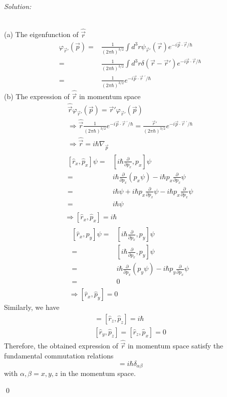 \documentclass[12pt,a4paper]{article}
\newenvironment{sol}
    {\emph{Solution:}
    }
    {
    \qed
    }
\begin{document}
\begin{sol}
\\(a) The eigenfunction of $\hat{\vec{r}}$
\begin{align}
\nonumber\varphi_{\vec{r}'}(\vec{p})=&\frac{1}{(2\pi\hbar)^{3/2}}\int d^3r\psi_{\vec{r}'}(\vec{r})e^{-i\vec{p}\cdot\vec{r}/\hbar}\\
\nonumber=&\frac{1}{(2\pi\hbar)^{3/2}}\int d^3r\delta(\vec{r}-\vec{r}')e^{-i\vec{p}\cdot\vec{r}/\hbar}\\
=&\frac{1}{(2\pi\hbar)^{3/2}}e^{-i\vec{p}\cdot\vec{r}{~}^{'}/\hbar}
\end{align}
(b) The expression of $\hat{\vec{r}}$ in momentum space
\begin{gather}
\hat{\vec{r}}\varphi_{\vec{r}'}(\vec{p})=\vec{r}'\varphi_{\vec{r}'}(\vec{p})\\
\Longrightarrow\hat{\vec{r}}\frac{1}{(2\pi\hbar)^{3/2}}e^{-i\vec{p}\cdot\vec{r}{~}^{'}/\hbar}=\frac{\vec{r}'}{(2\pi\hbar)^{3/2}}e^{-i\vec{p}\cdot\vec{r}{~}^{'}/\hbar}\\
\Longrightarrow\hat{\vec{r}}=i\hbar\nabla_{\vec{p}}
\end{gather}
\begin{gather}
\begin{align}
\nonumber[\hat{r}_x,\hat{p}_x]\psi=&[i\hbar\frac{\partial}{\partial p_x},p_x]\psi\\
\nonumber=&i\hbar\frac{\partial}{\partial p_x}(p_x\psi)-i\hbar p_x\frac{\partial}{\partial p_x}\psi\\
\nonumber=&i\hbar\psi+i\hbar p_x\frac{\partial}{\partial p_x}\psi-i\hbar p_x\frac{\partial}{\partial p_x}\psi\\
=&i\hbar\psi
\end{align}\\
\Longrightarrow[\hat{r}_x,\hat{p}_x]=i\hbar
\end{gather}
\begin{gather}
\begin{align}
\nonumber[\hat{r}_x,\hat{p}_y]\psi=&[i\hbar\frac{\partial}{\partial p_x},p_y]\psi\\
\nonumber=&[i\hbar\frac{\partial}{\partial p_x},p_y]\psi\\
\nonumber=&i\hbar\frac{\partial}{\partial p_x}(p_y\psi)-i\hbar p_y\frac{\partial}{\partial p_x}\psi\\
=&0
\end{align}\\
\Longrightarrow[\hat{r}_x,\hat{p}_y]=0
\end{gather}
Similarly, we have
\begin{gather}
[\hat{r}_y,\hat{p}_y]=[\hat{r}_z,\hat{p}_z]=i\hbar\\
[\hat{r}_y,\hat{p}_z]=[\hat{r}_z,\hat{p}_x]=0
\end{gather}
Therefore, the obtained expression of $\hat{\vec{r}}$ in momentum
space satisfy the fundamental commutation relations
\begin{equation}
[\hat{r}_{\alpha},\hat{p}_{\beta}]=i\hbar\delta_{\alpha\beta}
\end{equation}
with $\alpha,\beta=x,y,z$ in the momentum space.
\end{sol}
\end{document}
